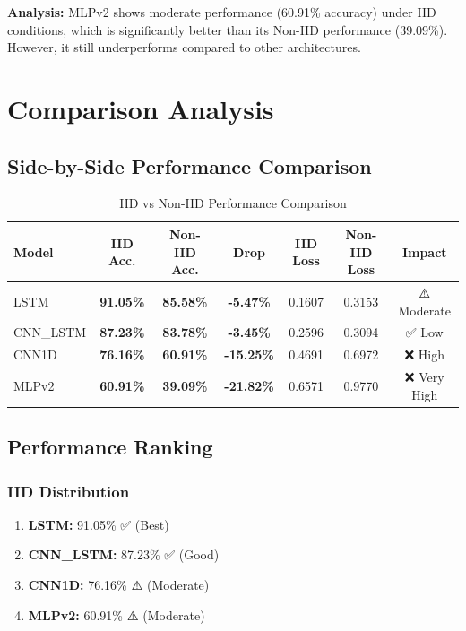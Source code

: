 \documentclass[12pt,a4paper]{article}
\begin{document}
\textbf{Analysis:} MLPv2 shows moderate performance (60.91\% accuracy) under IID conditions, which is significantly better than its Non-IID performance (39.09\%). However, it still underperforms compared to other architectures.

\section{Comparison Analysis}

\subsection{Side-by-Side Performance Comparison}

\begin{table}[h]
\centering
\small
\begin{tabular}{@{}lcccccc@{}}
\toprule
\textbf{Model} & \textbf{IID Acc.} & \textbf{Non-IID Acc.} & \textbf{Drop} & \textbf{IID Loss} & \textbf{Non-IID Loss} & \textbf{Impact} \\
\midrule
LSTM & \textbf{91.05\%} & \textbf{85.58\%} & \textbf{-5.47\%} & 0.1607 & 0.3153 & ⚠️ Moderate \\
CNN\_LSTM & \textbf{87.23\%} & \textbf{83.78\%} & \textbf{-3.45\%} & 0.2596 & 0.3094 & ✅ Low \\
CNN1D & \textbf{76.16\%} & \textbf{60.91\%} & \textbf{-15.25\%} & 0.4691 & 0.6972 & ❌ High \\
MLPv2 & \textbf{60.91\%} & \textbf{39.09\%} & \textbf{-21.82\%} & 0.6571 & 0.9770 & ❌ Very High \\
\bottomrule
\end{tabular}
\caption{IID vs Non-IID Performance Comparison}
\end{table}

\subsection{Performance Ranking}

\subsubsection{IID Distribution}

\begin{enumerate}
    \item \textbf{LSTM:} 91.05\% ✅ (Best)
    \item \textbf{CNN\_LSTM:} 87.23\% ✅ (Good)
    \item \textbf{CNN1D:} 76.16\% ⚠️ (Moderate)
    \item \textbf{MLPv2:} 60.91\% ⚠️ (Moderate)
\end{enumerate}
\end{document}
